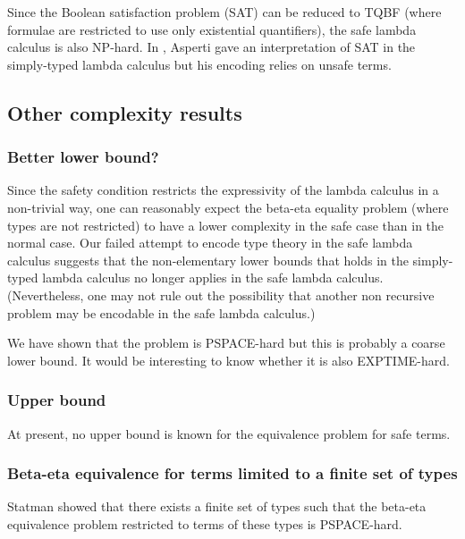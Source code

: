 \begin{remark}
Since the Boolean satisfaction problem (SAT) can be reduced to TQBF
(where formulae are restricted to use only existential quantifiers),
the safe lambda calculus is also NP-hard. In \cite{asperti-np},
Asperti gave an interpretation of SAT in the simply-typed lambda
calculus but his encoding relies on unsafe terms.
\end{remark}

\subsection{Other complexity results}




\subsubsection{Better lower bound?}
Since the safety condition restricts the expressivity of the lambda
calculus in a non-trivial way, one can reasonably expect the
beta-eta equality problem (where types are not restricted) to have a
lower complexity in the safe case than in the normal case. Our
failed attempt to encode type theory in the safe lambda calculus
suggests that the non-elementary lower bounds that holds in the
simply-typed lambda calculus no longer applies in the safe lambda
calculus. (Nevertheless, one may not rule out the possibility that
another non recursive problem may be encodable in the safe lambda
calculus.)

We have shown that the problem is PSPACE-hard but this is probably a coarse lower bound. It would be interesting to know
whether it is also EXPTIME-hard.

\subsubsection{Upper bound}
At present, no upper bound is known for the equivalence problem for safe terms. 


\subsubsection{Beta-eta equivalence for terms limited to a finite set of types}
Statman showed \cite{Statman:1979:TLE} that there exists a finite
set of types such that the beta-eta equivalence problem restricted to terms
of these types is PSPACE-hard.

